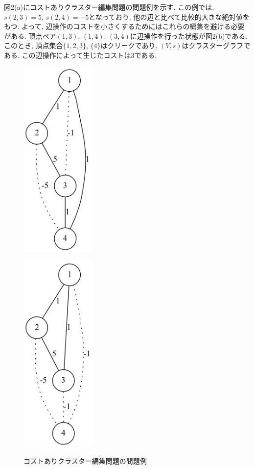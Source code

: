 \documentclass[10.5,a4paper,titlepage, dvipdfmx]{bxjsarticle}
\begin{document}
図2(a)にコストありクラスター編集問題の問題例を示す.
この例では, $s(2,3) = 5$, $s(2,4)=-5$となっており, 他の辺と比べて比較的大きな絶対値をもつ.
よって, 辺操作のコストを小さくするためにはこれらの編集を避ける必要がある.
頂点ペア$(1,3)$, $(1,4)$, $(3,4)$に辺操作を行った状態が図2(b)である.
このとき, 頂点集合$\{1,2,3\}$, $\{4\}$はクリークであり, $(V,s)$はクラスターグラフである.
この辺操作によって生じたコストは3である.

\begin{figure}[H]
    \centering
    \begin{minipage}{0.48\hsize}
        \centering
        \includegraphics[height=10cm]{example2.png}
        \label{fig:left}
    \end{minipage}
    \begin{minipage}{0.48\hsize}
        \centering
        \includegraphics[height=10cm]{example2_.png}
        \label{fig:right}
    \end{minipage}
    \caption{コストありクラスター編集問題の問題例}
    \label{fig:left_right}
\end{figure}
\end{document}
